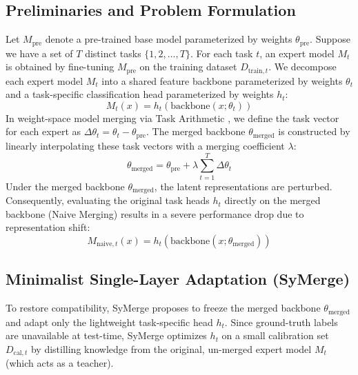 \documentclass{article}
\theoremstyle{plain}
\theoremstyle{definition}
\theoremstyle{remark}
\begin{document}
\subsection{Preliminaries and Problem Formulation}
Let $M_{\text{pre}}$ denote a pre-trained base model parameterized by weights $\theta_{\text{pre}}$. Suppose we have a set of $T$ distinct tasks $\{1, 2, \dots, T\}$. For each task $t$, an expert model $M_t$ is obtained by fine-tuning $M_{\text{pre}}$ on the training dataset $D_{\text{train}, t}$. We decompose each expert model $M_t$ into a shared feature backbone parameterized by weights $\theta_t$ and a task-specific classification head parameterized by weights $h_t$:
\begin{equation}
    M_t(x) = h_t(\text{backbone}(x; \theta_t))
\end{equation}
In weight-space model merging via Task Arithmetic \cite{ilharco2022editing}, we define the task vector for each expert as $\Delta\theta_t = \theta_t - \theta_{\text{pre}}$. The merged backbone $\theta_{\text{merged}}$ is constructed by linearly interpolating these task vectors with a merging coefficient $\lambda$:
\begin{equation}
    \theta_{\text{merged}} = \theta_{\text{pre}} + \lambda \sum_{t=1}^T \Delta\theta_t
\end{equation}
Under the merged backbone $\theta_{\text{merged}}$, the latent representations are perturbed. Consequently, evaluating the original task heads $h_t$ directly on the merged backbone (Naive Merging) results in a severe performance drop due to representation shift:
\begin{equation}
    M_{\text{naive}, t}(x) = h_t(\text{backbone}(x; \theta_{\text{merged}}))
\end{equation}

\subsection{Minimalist Single-Layer Adaptation (SyMerge)}
To restore compatibility, SyMerge \cite{jung2026symerge} proposes to freeze the merged backbone $\theta_{\text{merged}}$ and adapt only the lightweight task-specific head $h_t$. Since ground-truth labels are unavailable at test-time, SyMerge optimizes $h_t$ on a small calibration set $D_{\text{cal}, t}$ by distilling knowledge from the original, un-merged expert model $M_t$ (which acts as a teacher).
\end{document}
